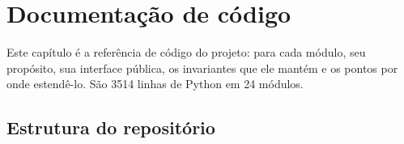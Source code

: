 \chapter{Documentação de código}
\label{cap:codigo}

Este capítulo é a referência de código do projeto: para cada módulo, seu
propósito, sua interface pública, os invariantes que ele mantém e os pontos por
onde estendê-lo. São \num{3514} linhas de Python em 24 módulos.

\section{Estrutura do repositório}

